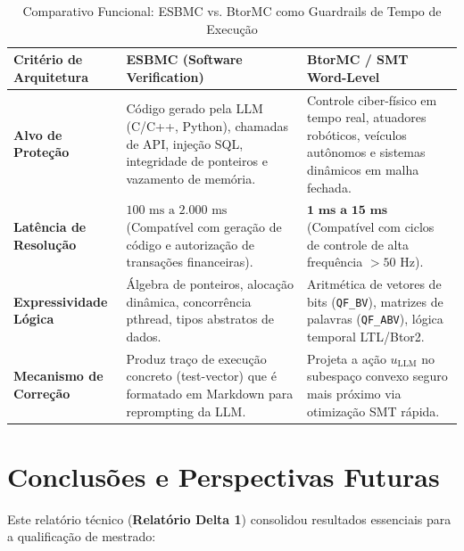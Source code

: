 \documentclass[11pt,a4paper]{article}
\theoremstyle{definition}
\begin{document}
\begin{table}[!ht]
\centering
\small
\caption{Comparativo Funcional: ESBMC vs. BtorMC como Guardrails de Tempo de Execução}
\label{tab:guardrails_llm}
\vspace{0.15cm}
\begin{tabularx}{\textwidth}{l X X}
\toprule
\textbf{Critério de Arquitetura} & \textbf{ESBMC (Software Verification)} & \textbf{BtorMC / SMT Word-Level} \\
\midrule
\textbf{Alvo de Proteção} & Código gerado pela LLM (C/C++, Python), chamadas de API, injeção SQL, integridade de ponteiros e vazamento de memória. & Controle ciber-físico em tempo real, atuadores robóticos, veículos autônomos e sistemas dinâmicos em malha fechada. \\
\addlinespace
\textbf{Latência de Resolução} & $100\text{ ms} \text{ a } 2.000\text{ ms}$ (Compatível com geração de código e autorização de transações financeiras). & $\mathbf{1\text{ ms} \text{ a } 15\text{ ms}}$ (Compatível com ciclos de controle de alta frequência $> 50$ Hz). \\
\addlinespace
\textbf{Expressividade Lógica} & Álgebra de ponteiros, alocação dinâmica, concorrência pthread, tipos abstratos de dados. & Aritmética de vetores de bits (\texttt{QF\_BV}), matrizes de palavras (\texttt{QF\_ABV}), lógica temporal LTL/Btor2. \\
\addlinespace
\textbf{Mecanismo de Correção} & Produz traço de execução concreto (test-vector) que é formatado em Markdown para reprompting da LLM. & Projeta a ação $u_{\text{LLM}}$ no subespaço convexo seguro mais próximo via otimização SMT rápida. \\
\bottomrule
\end{tabularx}
\end{table}

\section{Conclusões e Perspectivas Futuras}

Este relatório técnico (\textbf{Relatório Delta 1}) consolidou resultados essenciais para a qualificação de mestrado:
\end{document}
